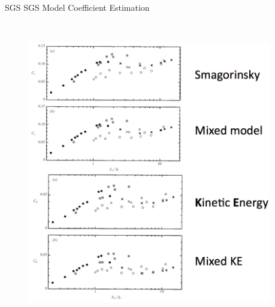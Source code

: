 \begin{frame}{SGS SGS Model Coefficient Estimation}
\begin{columns}
\begin{column}{.6\textwidth}
\begin{figure}
      ~\\\includegraphics[width=0.95\textwidth]{apriori15}
      \end{figure}
    \end{column}
  \end{columns}
\end{frame}
